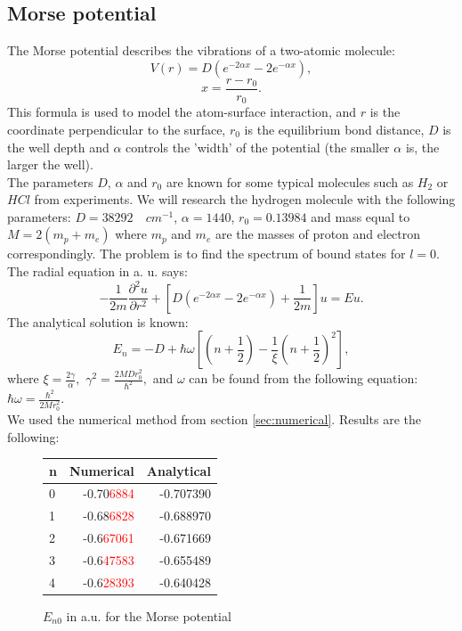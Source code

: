 \documentclass[a4paper, 12pt]{article}
\begin{document}
\subsection{Morse potential}
The Morse potential describes the vibrations of a two-atomic molecule:
\begin{equation}
V(r) = D(e^{-2\alpha x} - 2e^{-\alpha x}), 
\end{equation}
$$x= \frac{r-r_0}{r_0}.$$
This formula is used to model the atom-surface interaction, and  $r$ is the coordinate perpendicular to the surface, $r_0$ is the equilibrium bond distance, $D$ is the well depth and $\alpha$ controls the 'width' of the potential (the smaller $\alpha$ is, the larger the well). \\
The parameters $D$, $\alpha$ and $r_0$ are known for some typical molecules such as $H_2$ or $H Cl$ from experiments. We will research the hydrogen molecule with the following parameters: $D = 38292 \quad cm^{-1}$, $\alpha= 1440$, $r_0 = 0.13984$ and mass equal to $M = 2(m_p + m_e)$ where $m_p$ and $m_e$ are the masses of proton and electron correspondingly. The problem is to find the spectrum of bound states for $l=0$. \\
The radial equation 
in a. u.  says:
$$-\frac{1}{2m}\frac{\partial^2 u}{\partial r^2}+[D(e^{-2\alpha x} - 2e^{-\alpha x})+\frac{1}{2m}]u = Eu.$$
The analytical solution is known:
$$E_n = -D + \hbar \omega [(n+\frac{1}{2}) - \frac{1}{\xi}(n+\frac{1}{2})^2],$$
where $\xi = \frac{2 \gamma}{\alpha},$ $\gamma^2 = \frac{2 M D r_0^2}{\hbar^2},$ and $\omega$ can be found from the following equation: $\hbar \omega = \frac{\hbar^2}{2 M  r_0^2}.$\\
We used the numerical method from section \ref{sec:numerical}. Results are the following:

\begin{figure}[h!]
	\centering
\begin{tabular}{lrr}
	\toprule
	n & Numerical & Analytical \\
	\midrule
	0 & -0.70\textcolor{red}{6884} & -0.707390 \\
	1 & -0.68\textcolor{red}{6828} & -0.688970 \\
	2 & -0.6\textcolor{red}{67061} & -0.671669 \\
	3 & -0.6\textcolor{red}{47583} & -0.655489 \\
	4 & -0.6\textcolor{red}{28393} & -0.640428 \\
	\bottomrule
\end{tabular}
	\caption{$E_{n0}$ in a.u. for the Morse potential}
\end{figure}
\end{document}
